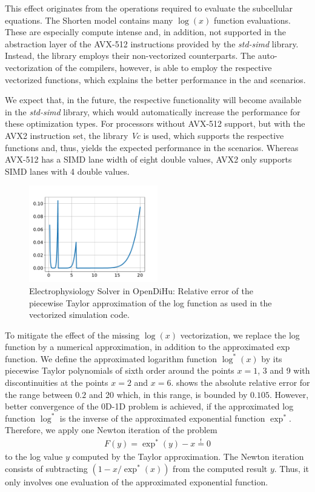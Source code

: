 This effect originates from the operations required to evaluate the subcellular equations. The Shorten model contains many $\log(x)$ function evaluations. These are especially compute intense and, in addition, not supported in the abstraction layer of the AVX-512 instructions provided by the \emph{std-simd} library. Instead, the library employs their non-vectorized counterparts. The auto-vectorization of the compilers, however, is able to employ the respective vectorized functions, which explains the better performance in the  and  scenarios. 

We expect that, in the future, the respective functionality will become available in the \emph{std-simd} library, which would automatically increase the performance for these optimization types. For processors without AVX-512 support, but with the AVX2 instruction set, the library \emph{Vc} is used, which supports the respective functions and, thus, yields the expected performance in the  scenarios. Whereas AVX-512 has a SIMD lane width of eight double values, AVX2 only supports SIMD lanes with 4 double values.

\begin{figure}
  \centering%
  \includegraphics[width=0.5\textwidth]{images/results/studies/apxlog.pdf}%
  \caption{Electrophysiology Solver in OpenDiHu: Relative error of the piecewise Taylor approximation of the log function as used in the vectorized simulation code.}%
  \label{fig:apxlog}%
\end{figure}%
To mitigate the effect of the missing $\log(x)$ vectorization, we replace the log function by a numerical approximation, in addition to the approximated exp function. We define the approximated logarithm function $\log^\ast(x)$ by its piecewise Taylor polynomials of sixth order around the points $x=1$, 3 and 9 with discontinuities at the points $x=2$ and $x=6$.  shows the absolute relative error for the range between $0.2$ and 20 which, in this range, is bounded by $0.105$. However, better convergence of the 0D-1D problem is achieved, if the approximated log function $\log^\ast$ is the inverse of the approximated exponential function $\exp^\ast$. Therefore, we apply one Newton iteration of the problem %
\begin{align*}
  F(y) = \exp^\ast(y)-x \overset{!}{=} 0  
\end{align*}
%
to the log value $y$ computed by the Taylor approximation. The Newton iteration consists of subtracting ${(1 - x/\exp^\ast(x))}$ from the computed result $y$. Thus, it only involves one evaluation of the approximated exponential function.

